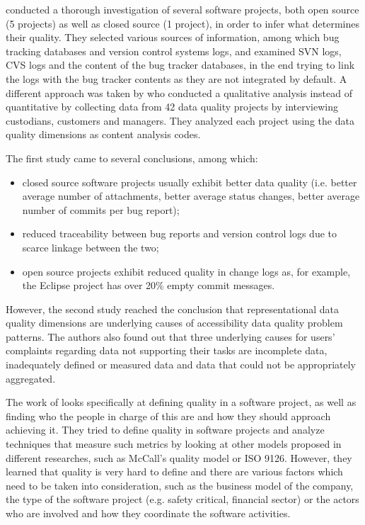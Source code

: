 \documentclass[11pt,english,twocolumn]{article}
\begin{document}
\cite{bachmann2009software} conducted a thorough investigation of several
software projects, both open source (5 projects) as well as closed source (1 
project), in order to infer what determines their quality. They selected 
various sources of information, among which bug tracking 
databases and version control systems logs, and examined SVN logs, CVS logs
and the content of the bug tracker databases, in the end trying to link 
the logs with the bug tracker contents as they are not integrated by default. 
A different approach was taken by \cite{strong1997data} who conducted a qualitative analysis
instead of quantitative by collecting data from 42 data quality projects by 
interviewing custodians, customers and managers. They analyzed each project
using the data quality dimensions as content analysis codes.

The first study came to several conclusions, among which:
  \begin{itemize}
    \item closed source software projects usually exhibit better data quality 
    (i.e. better average number of attachments, better average status changes, 
    better average number of commits per bug report);
    \item reduced traceability between bug reports and version control logs
    due to scarce linkage between the two;
    \item open source projects exhibit reduced quality in change logs as,
    for example, the Eclipse project has over 20\% empty commit messages.
  \end{itemize}

However, the second study reached the conclusion that representational data 
quality dimensions are underlying causes of accessibility data quality problem
patterns. The authors also found out that three underlying causes for users'
complaints regarding data not supporting their tasks are incomplete data, 
inadequately defined or measured data and data that could not be appropriately
aggregated.

The work of \cite{kitchenham1996software} looks specifically at defining
quality in a software project, as well as finding who the people in charge of this 
are and how they should approach achieving it. They tried to define quality 
in software projects and analyze techniques that measure such metrics by looking
at other models proposed in different researches, such as McCall's quality
model or ISO 9126. However, they learned that quality is very hard to define and
there are various factors which need to be taken into consideration, such as the
business model of the company, the type of the software project (e.g. safety 
critical, financial sector) or the actors who are involved and how they coordinate
the software activities.
\end{document}
